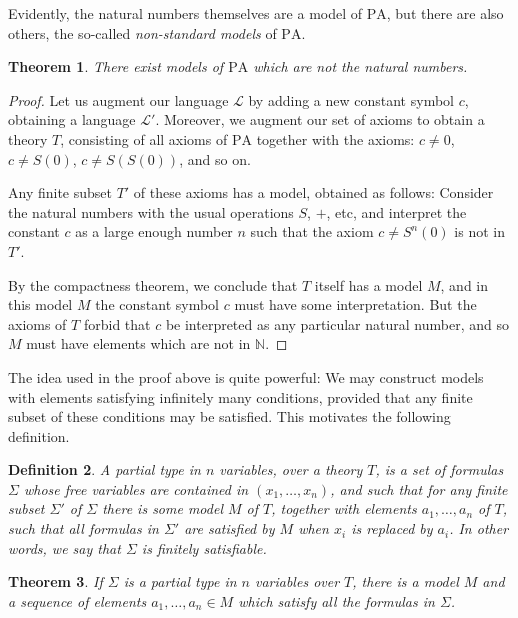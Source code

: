 \documentclass{article}
\newtheorem{theorem}{Theorem}[section]
\newtheorem{definition}[theorem]{Definition}
\theoremstyle{nonumberplain}
\newtheorem{proof}{Proof}
\newcommand{\N}{\mathbb{N}}
\newcommand{\Lang}{\mathcal{L}}
\begin{document}
Evidently, the natural numbers themselves are a model of $\mathrm{PA}$, but there are also others, the so-called \emph{non-standard models} of $\mathrm{PA}$.

\begin{theorem}\label{thm:nonstd}
There exist models of $\mathrm{PA}$ which are not the natural numbers.
\end{theorem}

\begin{proof}
Let us augment our language $\Lang$ by adding a new constant symbol $c$, obtaining a language $\Lang'$. Moreover, we augment our set of axioms to obtain a theory $T$, consisting of all axioms of $\mathrm{PA}$ together with the axioms: $c \neq 0$, $c \neq S(0)$, $c \neq S(S(0))$, and so on.

Any finite subset $T'$ of these axioms has a model, obtained as follows: Consider the natural numbers with the usual operations $S$, $+$, etc, and interpret the constant $c$ as a large enough number $n$ such that the axiom $c \neq S^n(0)$ is not in $T'$.

By the compactness theorem, we conclude that $T$ itself has a model $M$, and in this model $M$ the constant symbol $c$ must have some interpretation. But the axioms of $T$ forbid that $c$ be interpreted as any particular natural number, and so $M$ must have elements which are not in $\N$.
\end{proof}

The idea used in the proof above is quite powerful: We may construct models with elements satisfying infinitely many conditions, provided that any finite subset of these conditions may be satisfied. This motivates the following definition.

\begin{definition}
A partial type in $n$ variables, over a theory $T$, is a set of formulas $\Sigma$ whose free variables are contained in $(x_1, \dots, x_n)$, and such that for any finite subset $\Sigma'$ of $\Sigma$ there is some model $M$ of $T$, together with elements $a_1, \dots, a_n$ of $T$, such that all formulas in $\Sigma'$ are satisfied by $M$ when $x_i$ is replaced by $a_i$. In other words, we say that $\Sigma$ is \emph{finitely satisfiable}.
\end{definition}

\begin{theorem}\label{thm:ptype}
If $\Sigma$ is a partial type in $n$ variables over $T$, there is a model $M$ and a sequence of elements $a_1, \dots, a_n \in M$ which satisfy all the formulas in $\Sigma$.
\end{theorem}
\end{document}
